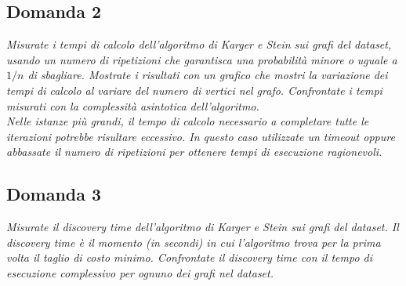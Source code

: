 \subsection{Domanda 2}
\textit{Misurate i tempi di calcolo dell'algoritmo di Karger e Stein sui grafi del dataset, usando un numero di ripetizioni che garantisca una probabilità minore o uguale a $1/n$ di sbagliare. Mostrate i risultati con un grafico che mostri la variazione dei tempi di calcolo al variare del numero di vertici nel grafo. Confrontate i tempi misurati con la complessità asintotica dell'algoritmo. \\
Nelle istanze più grandi, il tempo di calcolo necessario a completare tutte le iterazioni potrebbe risultare eccessivo. In questo caso utilizzate un timeout oppure abbassate il numero di ripetizioni per ottenere tempi di esecuzione ragionevoli.}

\subsection{Domanda 3}
\textit{Misurate il discovery time dell'algoritmo di Karger e Stein sui grafi del dataset. Il discovery time è il momento (in secondi) in cui l'algoritmo trova per la prima volta il taglio di costo minimo.  Confrontate il discovery time con il tempo di esecuzione complessivo per ognuno dei grafi nel dataset.}

